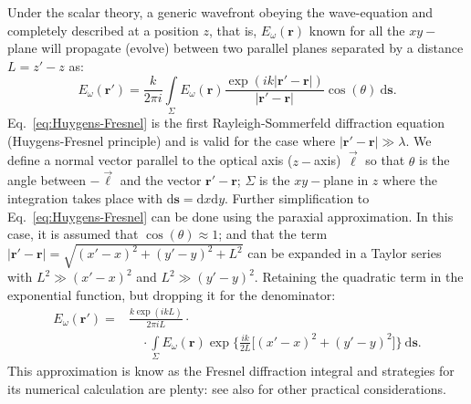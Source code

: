 \documentclass{iucr}              %
\begin{document}
Under the scalar theory, a generic wavefront obeying the wave-equation and completely described at a position $z$, that is, $E_\omega(\textbf{r})$ known for all the $xy-$plane will propagate (evolve) between two parallel planes separated by a distance $L=z'-z$ as: 
\begin{equation}\label{eq:Huygens-Fresnel}
    E_\omega(\textbf{r}') = \frac{k}{2\pi i}\int\limits_{\Sigma}{E_\omega(\textbf{r})\frac{\exp{(ik\vert\textbf{r}' - \textbf{r}\vert)}}{\vert\textbf{r}' - \textbf{r}\vert}\cos{(\theta)}~\mathrm{d}\textbf{s}}.
\end{equation}
Eq.~\ref{eq:Huygens-Fresnel} is the first Rayleigh-Sommerfeld diffraction equation (Huygens-Fresnel principle) and is valid for the case where $\vert\textbf{r}' - \textbf{r}\vert\gg\lambda$. We define a normal vector parallel to the optical axis ($z-$axis) $\vec{\ell}$ so that $\theta$ is the angle between $-\vec{\ell}$ and the vector $\textbf{r}'-\textbf{r}$; $\Sigma$ is the $xy-$plane in $z$ where the integration takes place with $\mathrm{d}\textbf{s}=\mathrm{d}x\mathrm{d}y$. Further simplification to Eq.~\ref{eq:Huygens-Fresnel} can be done using the paraxial approximation. In this case, it is assumed that $\cos{(\theta)}\approx1$; and that the term $\vert\textbf{r}' - \textbf{r}\vert=\sqrt{(x'-x)^2 + (y'-y)^2 + L^2}$ can be expanded in a Taylor series with $L^2\gg(x'-x)^2$ and $L^2\gg(y'-y)^2$. Retaining the quadratic term in the exponential function, but dropping it for the denominator:
\begin{equation}\label{eq:Fresnel}
\begin{split}
    E_\omega(\textbf{r}') = &\frac{k\exp{(ikL)}}{2\pi i L}\cdot \\
    &\quad\cdot\int\limits_{\Sigma}{E_\omega(\textbf{r})\exp{\bigg\{ \frac{ik}{2L}\big[ (x'-x)^2 + (y'-y)^2 \big]\bigg\}}~\mathrm{d}\textbf{s}}.
\end{split}
\end{equation}
This approximation is know as the Fresnel diffraction integral and strategies for its numerical calculation are plenty: \cite{Kelly2014,Goodman2017} see also \cite{Rees87, Stern2004, Zhang2020} for other practical considerations.

\end{document}

